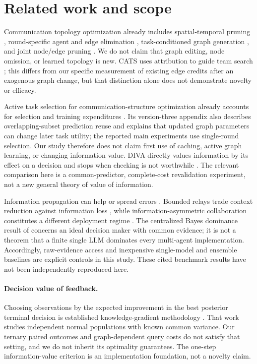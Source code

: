 \section{Related work and scope}
Communication topology optimization already includes spatial-temporal
pruning \citep{agentprune}, round-specific agent and edge elimination
\citep{agentdropout}, task-conditioned graph generation \citep{gdesigner},
and joint node/edge pruning \citep{agp}. We do not claim that graph editing,
node omission, or learned topology is new. CATS uses attribution to guide
team search \citep{cats}; this differs from our specific measurement of
existing edge credits after an exogenous graph change, but that distinction
alone does not demonstrate novelty or efficacy.

Active task selection for communication-structure optimization already
accounts for selection and training expenditures \citep{activegraph}.
Its version-three appendix also describes overlapping-subset prediction reuse
and explains that updated graph parameters can change later task utility;
the reported main experiments use single-round selection. Our study therefore
does not claim first use of caching, active graph learning, or changing
information value. DIVA directly values information by its effect on a
decision and stops when checking is not worthwhile \citep{diva}. The relevant
comparison here is a common-predictor, complete-cost revalidation experiment,
not a new general theory of value of information.

Information propagation can help or spread errors \citep{propagation}.
Bounded relays trade context reduction against information loss
\citep{bottleneck}, while information-asymmetric collaboration constitutes a
different deployment regime \citep{iagents}. The centralized Bayes dominance
result of \citet{reliability} concerns an ideal decision maker with common
evidence; it is not a theorem that a finite single LLM dominates every
multi-agent implementation. Accordingly, raw-evidence access and inexpensive
single-model and ensemble baselines are explicit controls in this study.
These cited benchmark results have not been independently reproduced here.

\paragraph{Decision value of feedback.}
Choosing observations by the expected improvement in the best posterior
terminal decision is established knowledge-gradient methodology
\citep{frazier2008knowledge}. That work studies independent normal
populations with known common variance. Our ternary paired outcomes and
graph-dependent query costs do not satisfy that setting, and we do not
inherit its optimality guarantees. The one-step information-value criterion
is an implementation foundation, not a novelty claim.
